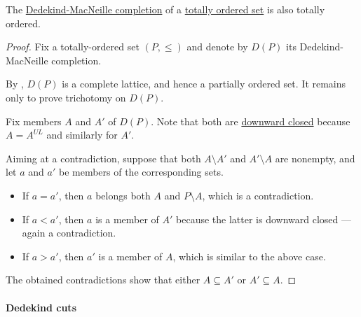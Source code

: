 \begin{proposition}\label{thm:dedekind_macneillecompletion_of_totally_ordered_set}
  The \hyperref[def:dedekind_macnielle_completion]{Dedekind-MacNeille completion} of a \hyperref[def:totally_ordered_set]{totally ordered set} is also totally ordered.
\end{proposition}
\begin{proof}
  Fix a totally-ordered set \( (P, \leq) \) and denote by \( D(P) \) its Dedekind-MacNeille completion.

  By , \( D(P) \) is a complete lattice, and hence a partially ordered set. It remains only to prove trichotomy on \( D(P) \).

  Fix members \( A \) and \( A' \) of \( D(P) \). Note that both are \hyperref[def:closed_ordered_subset]{downward closed} because \( A = A^{UL} \) and similarly for \( A' \).

  Aiming at a contradiction, suppose that both \( A \setminus A' \) and \( A' \setminus A \) are nonempty, and let \( a \) and \( a' \) be members of the corresponding sets.

  \begin{itemize}
    \item If \( a = a' \), then \( a \) belongs both \( A \) and \( P \setminus A \), which is a contradiction.
    \item If \( a < a' \), then \( a \) is a member of \( A' \) because the latter is downward closed --- again a contradiction.
    \item If \( a > a' \), then \( a' \) is a member of \( A \), which is similar to the above case.
  \end{itemize}

  The obtained contradictions show that either \( A \subseteq A' \) or \( A' \subseteq A \).
\end{proof}

\paragraph{Dedekind cuts}

